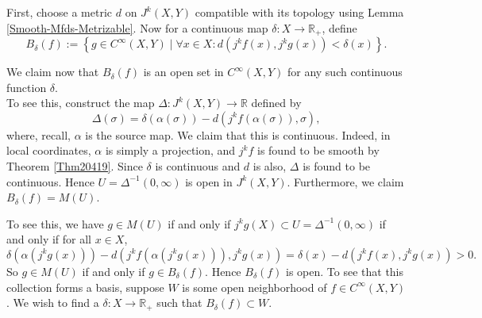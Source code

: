 \documentclass[reqno]{amsart}
\theoremstyle{definition}
\theoremstyle{remark}
\begin{document}
First, choose a metric $d$ on $J^{k}(X,Y)$ compatible with
its topology using Lemma \ref{Smooth-Mfds-Metrizable}.
Now for a continuous map
$\delta \colon X \to \mathbb{R}_{+}$, define
\[
B_{\delta}(f) :=
\left\{ g \in C^{\infty}(X,Y)  \mid 
\forall x \in X \colon
d \left( j^{k}f(x), j^{k}g(x) \right) < \delta(x)  \right\} .
\] 

We claim now that $B_{\delta}(f)$ is an open
set in $C^{\infty}(X,Y)$ for any such continuous function
$\delta$.\\
To see this, construct the map
$\Delta \colon J^{k}(X,Y) \to \mathbb{R}$ defined
by
\[
\Delta (\sigma) = 
\delta\left( \alpha \left( \sigma \right)  \right) -
d \left( j^{k}f \left( \alpha (\sigma) \right) ,
\sigma \right) ,
\] 
where, recall, $\alpha$ is the source map.
We claim that this is continuous.
Indeed, in local coordinates,
$\alpha$ is simply a projection, and 
$j^{k}f$ is found to be smooth 
by Theorem \ref{Thm20419}. Since
$\delta$ is continuous and $d$ is also,
$\Delta$ is found to be continuous.
Hence $U = \Delta^{-1}\left( 0,\infty \right) $ is
open in $J^{k}(X,Y)$. Furthermore,
we claim $B_{\delta}(f) = M(U)$.

To see this, we have
$g \in M(U)$ if and only if
$j^{k}g(X) \subset U = 
\Delta^{-1}(0,\infty)$ if and only if
for all $x \in X$,
\[
\delta \left( \alpha \left( j^{k}g(x) \right)  \right) 
- d \left( j^{k}f\left( \alpha\left( j^{k}g(x) \right) 
\right) , j^{k}g(x) \right) = 
\delta(x) - d \left( j^{k}f (x), j^{k}g(x) \right) > 0.
\] 
So
$g \in M(U)$ if and only if
$g \in B_{\delta}(f)$. Hence
$B_{\delta}(f)$ is open.
To see that this collection
forms a basis, suppose
$W$ is some open neighborhood of
$f \in C^{\infty}(X,Y)$. We wish to find a 
$\delta \colon X \to \mathbb{R}_+$ such that
$B_{\delta}(f) \subset W$.
\end{document}
